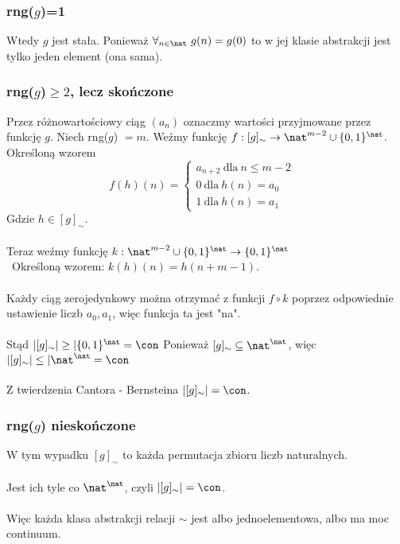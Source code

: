 \documentclass{article}
\begin{document}
\subsubsection*{rng($g$)=1}
Wtedy $g$ jest stała. Ponieważ $\forall_{n \in \nat} \ g(n) = g(0)$ to w jej klasie abstrakcji jest tylko jeden element (ona sama).

\subsubsection*{rng($g$)$\geq 2$, lecz skończone} 
Przez różnowartościowy ciąg $(a_n)$ oznaczmy wartości przyjmowane przez funkcję $g$. Niech rng($g$) $= m$. 
Weźmy funkcję $f: [g]_{\sim} \rightarrow  \nat ^ {m-2} \cup \{0,1\}^\nat$. Określoną wzorem \[f(h)(n) = \left\{\begin{array}{cc}  a_{n+2}
     \ \mbox{dla} \  n\leq m-2  &  \\
     0
     \ \mbox{dla} \  h(n) = a_0  &  \\
     1 \ \mbox{dla} \ h(n) = a_1 & 
\end{array}\right.\]
Gdzie $h \in [g]_\sim$.
\\\\
Teraz weźmy funkcję $k:  \nat^{m-2} \cup \{0,1\}^\nat \rightarrow \{0,1\}^\nat  $
\\\
Określoną wzorem: $k(h)(n) = h(n+m-1)$.
\\\\
Każdy ciąg zerojedynkowy można otrzymać z funkcji $f\circ k$ poprzez odpowiednie ustawienie liczb $a_0, a_1$, więc funkcja ta jest "na".
\\\\
Stąd $\vert [g]_\sim \vert \geq \vert \{0,1\}^\nat = \con$
Ponieważ $[g]_\sim \subseteq \nat^\nat$, więc $\vert [g]_\sim \vert \leq \vert \nat^\nat = \con$
\\\\
Z twierdzenia Cantora - Bernsteina $\vert [g]_\sim \vert = \con$.


\subsubsection*{rng($g$) nieskończone}
W tym wypadku $[g]_\sim$ to każda permutacja zbioru liczb naturalnych.
\\\\
Jest ich tyle co $\nat^\nat$, czyli $\vert [g]_\sim \vert = \con$.
\\\\
Więc każda klasa abstrakcji relacji $\sim$ jest albo jednoelementowa, albo ma moc continuum.
\end{document}
